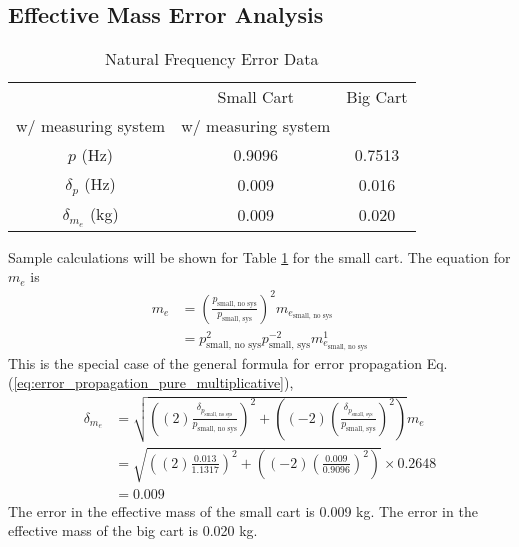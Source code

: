 \subsection{Effective Mass Error Analysis}

\begin{table}[H]
    \centering
    \caption{Natural Frequency Error Data}
    \label{tab:natural_frequency_error_data_for_effective_mass_appendix}
    \begin{tabular}{ccc}
        \toprule
        & Small Cart & Big Cart \\
        w/ measuring system  & w/ measuring system \\
        \midrule
        $p$ (Hz) & 0.9096 & 0.7513 \\
        $\delta_p$ (Hz) & 0.009 & 0.016 \\
        \midrule
        $\delta_{m_e}$ (kg) & 0.009 & 0.020 \\
        \bottomrule
    \end{tabular}
\end{table}
Sample calculations will be shown for Table \ref{tab:natural_frequency_error_data_for_effective_mass_appendix} for the small cart. The equation for $m_e$ is
\begin{align*}
    m_e &= \left(\frac{p_{\text{small, no sys}}}{p_{\text{small, sys}}}\right)^2 m_{e_{\text{small, no sys}}} \\
    &= p_{\text{small, no sys}}^2 p_{\text{small, sys}}^{-2} m_{e_{\text{small, no sys}}}^{1} 
\end{align*}
This is the special case of the general formula for error propagation Eq. (\ref{eq:error_propagation_pure_multiplicative}),
\begin{align*}
    \delta_{m_e} &= \sqrt{\left((2) \frac{\delta_{p_{\text{small, no sys}}}}{p_{\text{small, no sys}}}\right)^2 + \left((-2) \left(\frac{\delta_{p_{\text{small, sys}}}}{p_{\text{small, sys}}}\right)^2\right)} m_e \\
    &= \sqrt{\left((2) \frac{0.013}{1.1317}\right)^2 + \left((-2) \left(\frac{0.009}{0.9096}\right)^2\right)} \times 0.2648 \\
    &= \boxed{0.009}
\end{align*}
The error in the effective mass of the small cart is 0.009 kg. The error in the effective mass of the big cart is 0.020 kg.